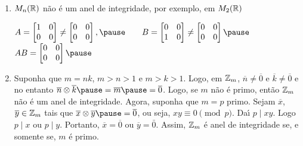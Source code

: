 \documentclass{beamer}
\begin{document}
    \begin{frame}
        \begin{exemplos}
            \begin{enumerate}[label={\arabic*})]
                \conti

                \item $M_{n}(\mathbb{R})$ \pause n{\~a}o {\'e} um anel de integridade, \pause por exemplo, em $M_{2}(\mathbb{R})$\pause
                \begin{center}
                    $A = \begin{bmatrix}
                        1 & 0\\
                        0 & 0
                    \end{bmatrix} \neq \begin{bmatrix}
                        0 & 0\\
                        0 & 0       
                    \end{bmatrix},\pause \qquad 
                    B = \begin{bmatrix}
                        0 & 0\\
                        1 & 0
                    \end{bmatrix} \neq \begin{bmatrix}
                        0 & 0\\
                        0 & 0
                    \end{bmatrix}\pause$\\
                    $AB  =\begin{bmatrix}
                        0 & 0\\
                        0 & 0
                    \end{bmatrix}\pause$
                \end{center}

                \vspace{.5cm}
                
                \item Suponha que $m = nk$, \pause $m > n > 1$ \pause e $m > k > 1$. \pause Logo, em $\mathbb{Z}_m$, \pause $\overline{n} \neq \overline{0}$ \pause e $\overline{k} \neq \overline{0}$ \pause e no entanto $\overline{n} \otimes \overline{k} \pause = \overline{m} \pause = \overline{0}$. \pause Logo, se $m$ n{\~a}o {\'e} primo, \pause ent{\~a}o $\mathbb{Z}_m$ n{\~a}o {\'e} um anel de integridade. \pause Agora, suponha que $m = p$ primo. \pause Sejam $\overline{x}$, \pause $\overline{y} \in \mathbb{Z}_m$ \pause tais que $\overline{x}\otimes \overline{y} \pause = \overline{0}$, \pause ou seja, $xy \equiv 0 \pmod p$. \pause Da{\'\i} $p\mid xy$. \pause Logo $p\mid x$ \pause ou $p\mid y$. \pause Portanto, $\overline{x} = \overline{0}$ \pause ou $\overline{y} = \bar{0}$. \pause Assim, $\mathbb{Z}_m$ {\'e} anel de integridade \pause se, e somente se, \pause $m$ {\'e} primo.\pause
            \end{enumerate}
        \end{exemplos}
    \end{frame}
    
\end{document}
